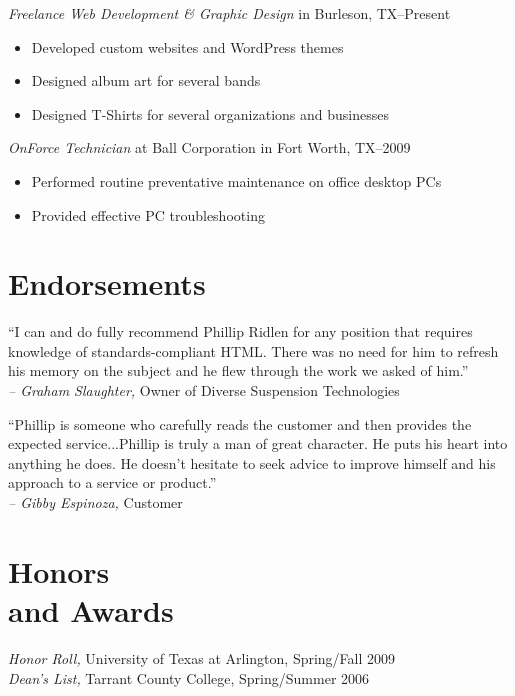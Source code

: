 \documentclass[margin]{res}
\begin{document}
\begin{resume}
                {\sl Freelance Web Development \textrm{\&} Graphic Design}
                in Burleson, TX--Present
                \begin{itemize} \itemsep -2pt %
                  \item Developed custom websites and WordPress themes
                  \item Designed album art for several bands
                  \item Designed T-Shirts for several organizations and businesses
                \end{itemize}
                
                {\sl OnForce Technician}
                at Ball Corporation in Fort Worth, TX--2009
                \begin{itemize} \itemsep -2pt %
                  \item Performed routine preventative maintenance on office desktop PCs
                  \item Provided effective PC troubleshooting
                \end{itemize}
          
                
                
\section{\textsf{Endorsements}}
                
                ``I can and do fully recommend Phillip Ridlen for any position that requires 
                knowledge of standards-compliant HTML. There was no need for him to refresh his 
                memory on the subject and he flew through the work we asked of him.'' \\
                {\sl -- Graham Slaughter,} Owner of Diverse Suspension Technologies

                ``Phillip is someone who carefully reads the customer and then 
                provides the expected service...Phillip is truly a man of great character. 
                He puts his heart into anything he does. He doesn't hesitate to seek advice 
                to improve himself and his approach to a service or product.'' \\
                {\sl -- Gibby Espinoza,} Customer


\section{\textsf{Honors \\and Awards}}{\sl Honor Roll,} University of Texas at Arlington, Spring/Fall 2009 \\
                {\sl Dean's List,} Tarrant County College, Spring/Summer 2006
                
                
\end{resume}
\end{document}
